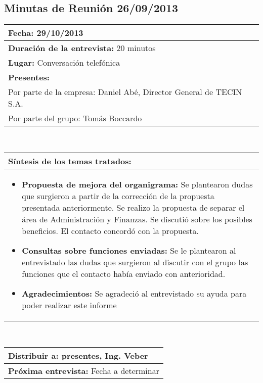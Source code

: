 \subsection{Minutas de Reunión 26/09/2013}
\begin{flushleft}
	\begin{tabular}{|p{15cm}|}
		\hline
		\textbf{Fecha:} 29/10/2013 \\ \hline
		\textbf{Duración de la entrevista:} 20 minutos\\ \hline
		\textbf{Lugar:} Conversación telefónica\\ \hline
		\textbf{Presentes:} \\
			Por parte de la empresa: Daniel Abé, Director General de TECIN S.A. \\ 
			Por parte del grupo: Tomás Boccardo \\ \hline
	\end{tabular}  \\
	\vspace{0.7cm}
	\begin{tabular}{|p{15cm}|}
		\hline
		\textbf{Síntesis de los temas tratados:}\\
		\hline
		\begin{itemize}
			\item \textbf{Propuesta de mejora del organigrama:}
			Se plantearon dudas que surgieron a partir de la corrección de la propuesta presentada anteriormente. Se realizo la propuesta de separar el área de Administración y Finanzas. Se discutió sobre los posibles beneficios. El contacto concordó con la propuesta.

		\item \textbf{Consultas sobre funciones enviadas:} 
		Se le plantearon al entrevistado las dudas que surgieron al discutir con el grupo las funciones que el contacto había enviado con anterioridad.

		\item \textbf{Agradecimientos:} Se agradeció al entrevistado su ayuda para poder realizar este informe

		\end{itemize} \\ \hline
	\end{tabular} \\
	\vspace{0.7cm}
	\begin{tabular}{|p{15cm}|}                
		\hline 
		\textbf{Distribuir a:} presentes, Ing. Veber\\
		\hline
		\textbf{Próxima entrevista:} Fecha a determinar\\
		\hline
	\end{tabular}	
	
\end{flushleft}